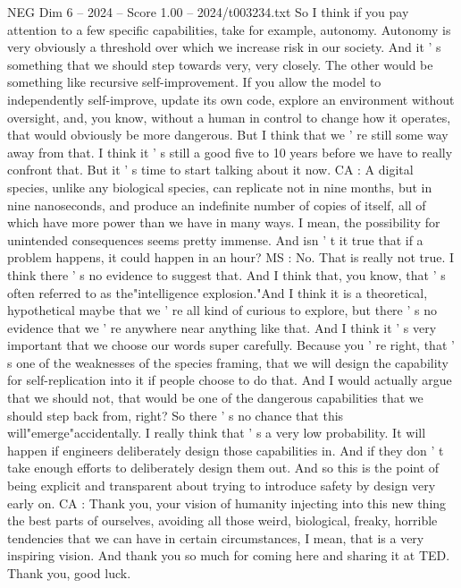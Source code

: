 \begin{textsample}{NEG Dim 6 – 2024 – Score 1.00 – 2024/t003234.txt}
So I think if you pay attention to a few specific capabilities, take for example, autonomy.
Autonomy is very obviously a threshold over which we increase risk in our society.
And it ' s something that we should step towards very, very closely.
The other would be something like recursive self-improvement.
If you allow the model to independently self-improve, update its own code, explore an environment without oversight, and, you know, without a human in control to change how it operates, that would obviously be more dangerous.
But I think that we ' re still some way away from that.
I think it ' s still a good five to 10 years before we have to really confront that.
But it ' s time to start talking about it now.
CA : A digital species, unlike any biological species, can replicate not in nine months, but in nine nanoseconds, and produce an indefinite number of copies of itself, all of which have more power than we have in many ways.
I mean, the possibility for unintended consequences seems pretty immense.
And isn ' t it true that if a problem happens, it could happen in an hour?
MS : No.
That is really not true.
I think there ' s no evidence to suggest that.
And I think that, you know, that ' s often referred to as the"intelligence explosion."And I think it is a theoretical, hypothetical maybe that we ' re all kind of curious to explore, but there ' s no evidence that we ' re anywhere near anything like that.
And I think it ' s very important that we choose our words super carefully.
Because you ' re right, that ' s one of the weaknesses of the species framing, that we will design the capability for self-replication into it if people choose to do that.
And I would actually argue that we should not, that would be one of the dangerous capabilities that we should step back from, right?
So there ' s no chance that this will"emerge"accidentally.
I really think that ' s a very low probability.
It will happen if engineers deliberately design those capabilities in.
And if they don ' t take enough efforts to deliberately design them out.
And so this is the point of being explicit and transparent about trying to introduce safety by design very early on.
CA : Thank you, your vision of humanity injecting into this new thing the best parts of ourselves, avoiding all those weird, biological, freaky, horrible tendencies that we can have in certain circumstances, I mean, that is a very inspiring vision.
And thank you so much for coming here and sharing it at TED.
Thank you, good luck.

\end{textsample}
